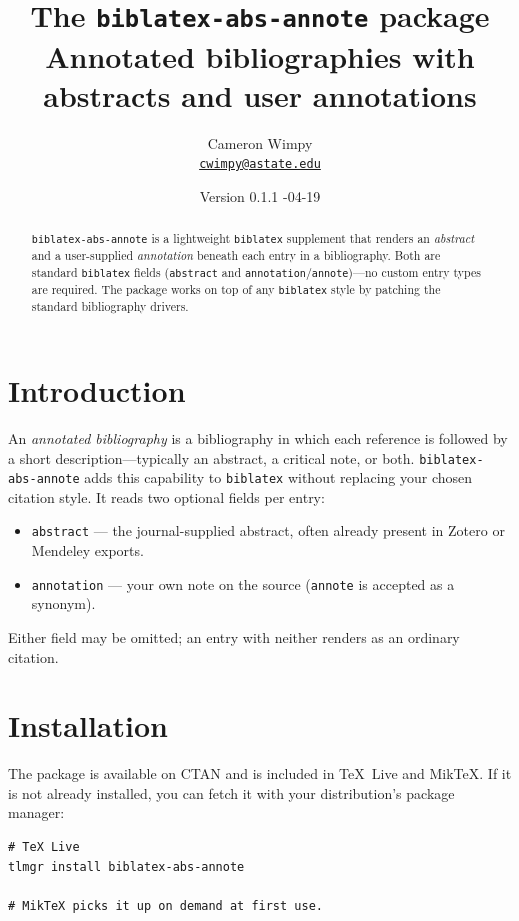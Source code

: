\documentclass[11pt]{article}
\title{The \texttt{biblatex-abs-annote} package\\[0.4em]
  \large Annotated bibliographies with abstracts and user annotations}
\author{Cameron Wimpy\\\href{mailto:cwimpy@astate.edu}{\texttt{cwimpy@astate.edu}}}
\date{Version 0.1.1 \quad 2026-04-19}
\begin{document}
\maketitle

\begin{abstract}
\noindent
\texttt{biblatex-abs-annote} is a lightweight \texttt{biblatex}
supplement that renders an \emph{abstract} and a user-supplied
\emph{annotation} beneath each entry in a bibliography. Both are
standard \texttt{biblatex} fields (\texttt{abstract} and
\texttt{annotation}/\texttt{annote})---no custom entry types are
required. The package works on top of any \texttt{biblatex} style by
patching the standard bibliography drivers.
\end{abstract}

\tableofcontents
\vspace{1em}

\section{Introduction}

An \emph{annotated bibliography} is a bibliography in which each
reference is followed by a short description---typically an abstract,
a critical note, or both. \texttt{biblatex-abs-annote} adds this
capability to \texttt{biblatex} without replacing your chosen citation
style. It reads two optional fields per entry:

\begin{itemize}[nosep]
  \item \texttt{abstract} --- the journal-supplied abstract, often
    already present in Zotero or Mendeley exports.
  \item \texttt{annotation} --- your own note on the source
    (\texttt{annote} is accepted as a synonym).
\end{itemize}

Either field may be omitted; an entry with neither renders as an
ordinary citation.

\section{Installation}

The package is available on CTAN and is included in TeX~Live and
MikTeX. If it is not already installed, you can fetch it with your
distribution's package manager:

\begin{Verbatim}
# TeX Live
tlmgr install biblatex-abs-annote

# MikTeX picks it up on demand at first use.
\end{Verbatim}
\end{document}
